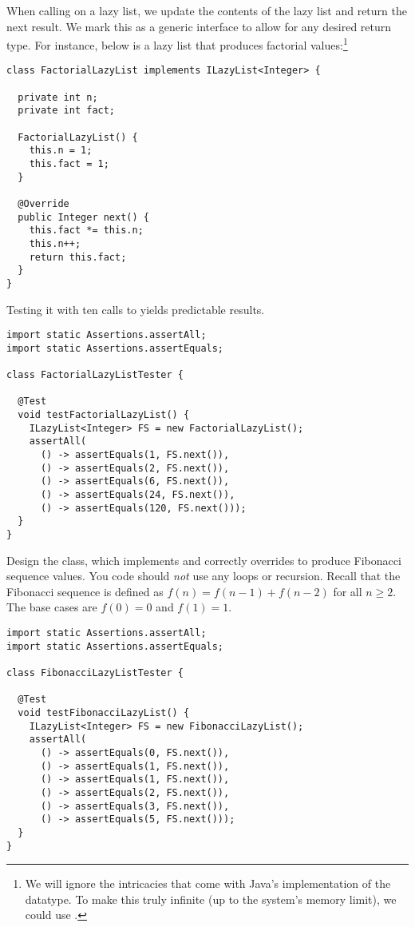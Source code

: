 When calling  on a lazy list, we update the contents of the lazy list and return the next result. We mark this as a generic interface to allow for any desired return type. For instance, below is a lazy list that produces factorial values:\footnote{We will ignore the intricacies that come with Java's implementation of the  datatype. To make this truly infinite (up to the system's memory limit), we could use .}

\newpage %
\begin{lstlisting}[language=MyJava]
class FactorialLazyList implements ILazyList<Integer> {

  private int n;
  private int fact;
 
  FactorialLazyList() {
    this.n = 1;
    this.fact = 1;
  }

  @Override
  public Integer next() {
    this.fact *= this.n;
    this.n++;
    return this.fact;
  }
}
\end{lstlisting}

Testing it with ten calls to  yields predictable results.

\begin{lstlisting}[language=MyJava]
import static Assertions.assertAll;
import static Assertions.assertEquals;

class FactorialLazyListTester {

  @Test
  void testFactorialLazyList() {
    ILazyList<Integer> FS = new FactorialLazyList();
    assertAll(
      () -> assertEquals(1, FS.next()),
      () -> assertEquals(2, FS.next()),
      () -> assertEquals(6, FS.next()),
      () -> assertEquals(24, FS.next()),
      () -> assertEquals(120, FS.next()));
  }
}
\end{lstlisting}

Design the  class, which implements  and correctly overrides  to produce Fibonacci sequence values. You code should \emph{not} use any loops or recursion. Recall that the Fibonacci sequence is defined as $f(n) = f(n - 1) + f(n - 2)$ for all $n\geq{2}$. The base cases are $f(0) = 0$ and $f(1) = 1$.

\begin{lstlisting}[language=MyJava]
import static Assertions.assertAll;
import static Assertions.assertEquals;

class FibonacciLazyListTester {

  @Test
  void testFibonacciLazyList() {
    ILazyList<Integer> FS = new FibonacciLazyList();
    assertAll(
      () -> assertEquals(0, FS.next()),
      () -> assertEquals(1, FS.next()),
      () -> assertEquals(1, FS.next()),
      () -> assertEquals(2, FS.next()),
      () -> assertEquals(3, FS.next()),
      () -> assertEquals(5, FS.next()));
  }
}
\end{lstlisting}

